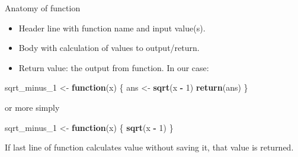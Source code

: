 \documentclass[
  ignorenonframetext,
]{beamer}
\newenvironment{Shaded}{\begin{snugshade}}{\end{snugshade}}
\newcommand{\ControlFlowTok}[1]{\textcolor[rgb]{0.13,0.29,0.53}{\textbf{#1}}}
\newcommand{\DecValTok}[1]{\textcolor[rgb]{0.00,0.00,0.81}{#1}}
\newcommand{\KeywordTok}[1]{\textcolor[rgb]{0.13,0.29,0.53}{\textbf{#1}}}
\newcommand{\NormalTok}[1]{#1}
\newcommand{\OperatorTok}[1]{\textcolor[rgb]{0.81,0.36,0.00}{\textbf{#1}}}
\newcommand{\StringTok}[1]{\textcolor[rgb]{0.31,0.60,0.02}{#1}}
\providecommand{\tightlist}{%
  \setlength{\itemsep}{0pt}\setlength{\parskip}{0pt}}
\begin{document}
\begin{frame}[fragile]{Anatomy of function}
\protect\hypertarget{anatomy-of-function}{}

\begin{itemize}
\tightlist
\item
  Header line with function name and input value(s).
\item
  Body with calculation of values to output/return.
\item
  Return value: the output from function. In our case:
\end{itemize}

\begin{Shaded}
\begin{Highlighting}[]
\NormalTok{sqrt_minus_}\DecValTok{1}\NormalTok{ <-}\StringTok{ }\ControlFlowTok{function}\NormalTok{(x) \{}
\NormalTok{  ans <-}\StringTok{ }\KeywordTok{sqrt}\NormalTok{(x }\OperatorTok{-}\StringTok{ }\DecValTok{1}\NormalTok{)}
  \KeywordTok{return}\NormalTok{(ans)}
\NormalTok{\}}
\end{Highlighting}
\end{Shaded}

or more simply

\begin{Shaded}
\begin{Highlighting}[]
\NormalTok{sqrt_minus_}\DecValTok{1}\NormalTok{ <-}\StringTok{ }\ControlFlowTok{function}\NormalTok{(x) \{}
  \KeywordTok{sqrt}\NormalTok{(x }\OperatorTok{-}\StringTok{ }\DecValTok{1}\NormalTok{)}
\NormalTok{\}}
\end{Highlighting}
\end{Shaded}

If last line of function calculates value without saving it, that value
is returned.

\end{frame}
\end{document}
